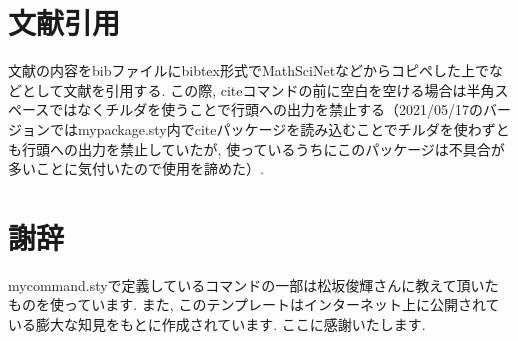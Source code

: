 \documentclass[11pt,a4paper,oneside,lualatex]{ltjsarticle} %
\begin{document}

\section{文献引用} \label{sec:bib}


文献の内容をbibファイルにbibtex形式でMathSciNetなどからコピペした上で\cite[定理 1.1]{AM}などとして文献を引用する.
この際, citeコマンドの前に空白を空ける場合は半角スペースではなくチルダを使うことで行頭への出力を禁止する（2021/05/17のバージョンではmypackage.sty内でciteパッケージを読み込むことでチルダを使わずとも行頭への出力を禁止していたが, 使っているうちにこのパッケージは不具合が多いことに気付いたので使用を諦めた）.


\section*{謝辞}


mycommand.styで定義しているコマンドの一部は松坂俊輝さんに教えて頂いたものを使っています.
また, このテンプレートはインターネット上に公開されている膨大な知見をもとに作成されています.
ここに感謝いたします.




\end{document}

